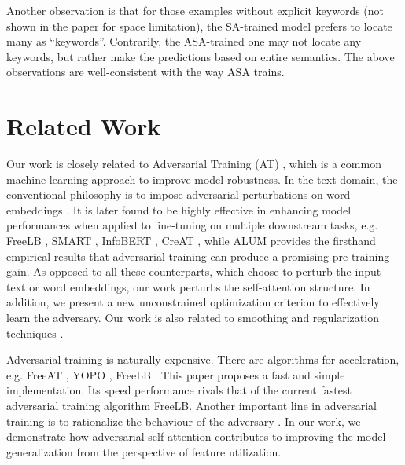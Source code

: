 \documentclass[letterpaper]{article} \usepackage{aaai23}  \usepackage{times}  \usepackage{helvet}  \usepackage{courier}  \usepackage[hyphens]{url}  \usepackage{graphicx} \urlstyle{rm} \def\UrlFont{\rm}  \usepackage{natbib}  \usepackage{caption} \frenchspacing  \setlength{\pdfpagewidth}{8.5in}  \setlength{\pdfpageheight}{11in}  \usepackage{algorithm}
\begin{document}
Another observation is that for those examples without explicit keywords (not shown in the paper for space limitation), the SA-trained model prefers to locate many as ``keywords''. Contrarily, the ASA-trained one may not locate any keywords, but rather make the predictions based on entire semantics. The above observations are well-consistent with the way ASA trains.


\section{Related Work}

Our work is closely related to Adversarial Training (AT) \citep{DBLP:journals/corr/GoodfellowSS14}, which is a common machine learning approach to improve model robustness. In the text domain, the conventional philosophy is to impose adversarial perturbations on word embeddings \citep{DBLP:conf/iclr/MiyatoDG17}. It is later found to be highly effective in enhancing model performances when applied to fine-tuning on multiple downstream tasks, e.g. FreeLB \citep{DBLP:conf/iclr/ZhuCGSGL20}, SMART \citep{DBLP:conf/acl/JiangHCLGZ20}, InfoBERT \citep{DBLP:conf/iclr/WangWCGJLL21}, CreAT \citep{wu2023toward}, while ALUM \citep{DBLP:journals/corr/abs-2004-08994} provides the firsthand empirical results that adversarial training can produce a promising pre-training gain. As opposed to all these counterparts, which choose to perturb the input text or word embeddings, our work perturbs the self-attention structure. In addition, we present a new unconstrained optimization criterion to effectively learn the adversary. Our work is also related to smoothing and regularization techniques \citep{DBLP:journals/neco/Bishop95,DBLP:journals/jmlr/SrivastavaHKSS14}.

Adversarial training is naturally expensive. There are algorithms for acceleration, e.g. FreeAT \citep{DBLP:conf/nips/ShafahiNG0DSDTG19}, YOPO \citep{DBLP:conf/nips/ZhangZLZ019}, FreeLB \citep{DBLP:conf/iclr/ZhuCGSGL20}. This paper proposes a fast and simple implementation. Its speed performance rivals that of the current fastest adversarial training algorithm FreeLB. Another important line in adversarial training is to rationalize the behaviour of the adversary \citep{DBLP:conf/ijcai/SatoSS018}. In our work, we demonstrate how adversarial self-attention contributes to improving the model generalization from the perspective of feature utilization.
\end{document}
